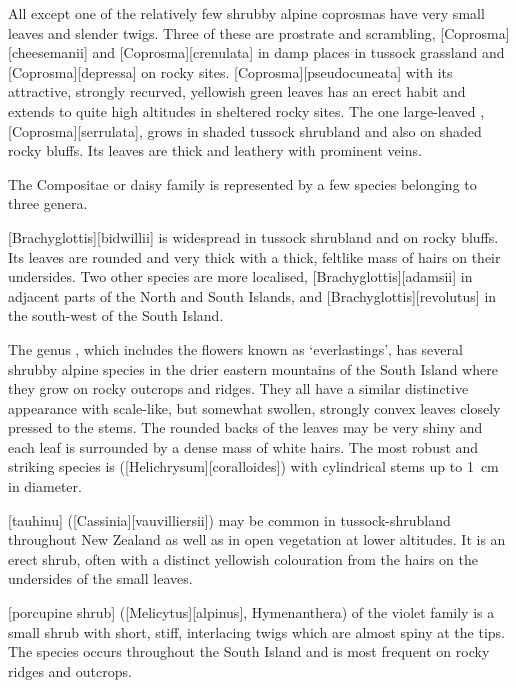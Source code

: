 All except one of the relatively few shrubby alpine coprosmas have very small leaves and slender twigs.
Three of these are prostrate and scrambling, [Coprosma][cheesemanii] and [Coprosma][crenulata] in damp places in tussock grassland and [Coprosma][depressa]  on rocky sites. [Coprosma][pseudocuneata] with its attractive, strongly recurved, yellowish green leaves has an erect habit and extends to quite high altitudes in sheltered rocky sites.
The one large-leaved , [Coprosma][serrulata], grows in shaded tussock shrubland  and also on shaded rocky bluffs.
Its leaves are thick and leathery with prominent veins.

The Compositae or daisy family is represented by a few species belonging to three genera.

[Brachyglottis][bidwillii] is widespread in tussock shrubland and on rocky bluffs.
Its leaves are rounded and very thick with a thick, feltlike mass of hairs on their undersides.
Two other species are more localised, [Brachyglottis][adamsii] in adjacent parts of the North and South Islands, and [Brachyglottis][revolutus] in the south-west of the South Island.

The genus , which includes the flowers known as `everlastings', has several shrubby alpine species in the drier eastern mountains of the South Island where they grow on rocky outcrops and ridges.
They all have a similar distinctive appearance with scale-like, but somewhat swollen, strongly convex leaves closely pressed to the stems.
The rounded backs of the leaves may be very shiny and each leaf is surrounded by a dense mass of white hairs.
The most robust and striking species is   ([Helichrysum][coralloides]) with cylindrical stems up to \SI{1}{\centi\metre} in diameter.

[tauhinu] ([Cassinia][vauvilliersii]) may be common in tussock-shrubland throughout New Zealand as well as in open vegetation at lower altitudes.
It is an erect shrub, often with a distinct yellowish colouration from the hairs on the undersides of the small leaves.

[porcupine shrub] ([Melicytus][alpinus], Hymenanthera) of the violet family is a small shrub with short, stiff, interlacing twigs which are almost spiny at the tips.
The species occurs throughout the South Island and is most frequent on rocky ridges and outcrops.


